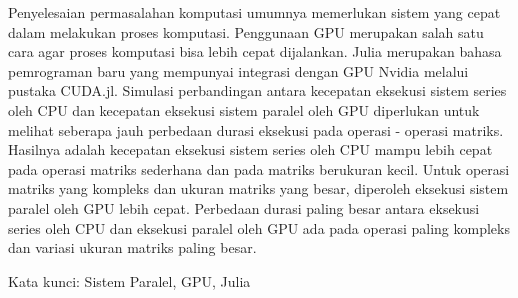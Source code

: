 \documentclass{skripsiactugm}
\begin{document}
%
\begin{abstractind}
	Penyelesaian permasalahan komputasi umumnya memerlukan sistem yang cepat dalam melakukan proses komputasi. Penggunaan GPU merupakan salah satu cara agar proses komputasi bisa lebih cepat dijalankan. Julia merupakan bahasa pemrograman baru yang mempunyai integrasi dengan GPU Nvidia melalui pustaka CUDA.jl. Simulasi perbandingan antara kecepatan eksekusi sistem series oleh CPU dan kecepatan eksekusi sistem paralel oleh GPU diperlukan untuk melihat seberapa jauh perbedaan durasi eksekusi pada operasi - operasi matriks. Hasilnya adalah kecepatan eksekusi sistem series oleh CPU mampu lebih cepat pada operasi matriks sederhana dan pada matriks berukuran kecil. Untuk operasi matriks yang kompleks dan ukuran matriks yang besar, diperoleh eksekusi sistem paralel oleh GPU lebih cepat. Perbedaan durasi paling besar antara eksekusi series oleh CPU dan eksekusi paralel oleh GPU ada pada operasi paling kompleks dan variasi ukuran matriks paling besar.


	Kata kunci: Sistem Paralel, GPU, Julia
\end{abstractind}
\end{document}
